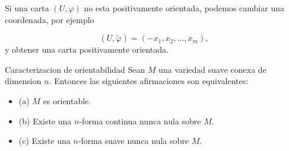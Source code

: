 \begin{bookremark}{}
Si una carta $(U,\varphi)$ no esta positivamente orientada, podemos cambiar una coordenada, por ejemplo

\[
(U,\widetilde\varphi)=(-x_1,x_2,\ldots,x_m),
\]
y obtener una carta positivamente orientada.

\end{bookremark}
\begin{bookproposition}{Caracterizacion de orientabilidad}
Sean $M$ una variedad suave conexa de dimension $n$. Entonces las siguientes afirmaciones son equivalentes:

\begin{itemize}
\item (a) $M$ es orientable.
\item (b) Existe una $n$-forma continua nunca nula sobre $M$.
\item (c) Existe una $n$-forma suave nunca nula sobre $M$.
\end{itemize}
\end{bookproposition}
